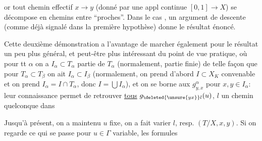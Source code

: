 or tout chemin effectif $x\longrightarrow y$ (donné par une appl continue $[0,1]\longrightarrow X$) se décompose en  chemins 
entre   ``proches''. Dans le cas ,  un argument de descente (comme déjà signalé dans la première hypothèse) donne le résultat énoncé.

Cette deuxième démonstration a l'avantage de marcher également pour  le résultat un peu plus général, et peut-être plus intéressant du point de vue pratique, où pour tt $\alpha$ on a $I_\alpha\subset T_\alpha$ partie  de $T_\alpha$ (normalement, partie finie) de telle façon que pour $T_\alpha\subset T_\beta$ on ait $I_\alpha\subset I_\beta$ (normalement, on prend d'abord $I\subset X_K$ convenable et on prend $I_\alpha=I\cap T_\alpha$, donc $I=\bigcup I_\alpha$), et on se borne aux $g^\alpha_{y,x}$ pour $x,y\in I_\alpha$: leur connaissance permet de retrouver \uline{tous}  $g_{\deleted{\unsure{yx}}l}(u)$, $l$ un chemin quelconque dans


Jusqu'à présent, on a maintenu $u$ fixe, on a fait varier $l$, resp. $(T/X,x,y)$. Si on regarde ce qui se passe pour $u\in\Gamma$ variable, les formules

